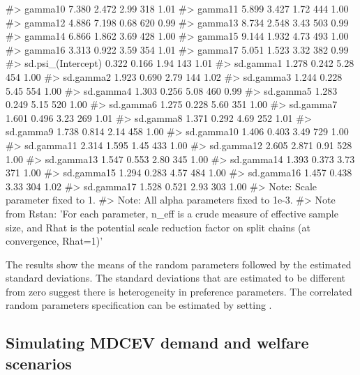 \begin{Schunk}
\begin{Soutput}
#> gamma10               7.380   2.472   2.99   318 1.01
#> gamma11               5.899   3.427   1.72   444 1.00
#> gamma12               4.886   7.198   0.68   620 0.99
#> gamma13               8.734   2.548   3.43   503 0.99
#> gamma14               6.866   1.862   3.69   428 1.00
#> gamma15               9.144   1.932   4.73   493 1.00
#> gamma16               3.313   0.922   3.59   354 1.01
#> gamma17               5.051   1.523   3.32   382 0.99
#> sd.psi_(Intercept)    0.322   0.166   1.94   143 1.01
#> sd.gamma1             1.278   0.242   5.28   454 1.00
#> sd.gamma2             1.923   0.690   2.79   144 1.02
#> sd.gamma3             1.244   0.228   5.45   554 1.00
#> sd.gamma4             1.303   0.256   5.08   460 0.99
#> sd.gamma5             1.283   0.249   5.15   520 1.00
#> sd.gamma6             1.275   0.228   5.60   351 1.00
#> sd.gamma7             1.601   0.496   3.23   269 1.01
#> sd.gamma8             1.371   0.292   4.69   252 1.01
#> sd.gamma9             1.738   0.814   2.14   458 1.00
#> sd.gamma10            1.406   0.403   3.49   729 1.00
#> sd.gamma11            2.314   1.595   1.45   433 1.00
#> sd.gamma12            2.605   2.871   0.91   528 1.00
#> sd.gamma13            1.547   0.553   2.80   345 1.00
#> sd.gamma14            1.393   0.373   3.73   371 1.00
#> sd.gamma15            1.294   0.283   4.57   484 1.00
#> sd.gamma16            1.457   0.438   3.33   304 1.02
#> sd.gamma17            1.528   0.521   2.93   303 1.00
#> Note: Scale parameter fixed to 1. 
#> Note: All alpha parameters fixed to 1e-3. 
#> Note from Rstan: 'For each parameter, n_eff is a crude measure of effective sample size, and Rhat is the potential scale reduction factor on split chains (at convergence, Rhat=1)'
\end{Soutput}
\end{Schunk}

The results show the means of the random parameters followed by the
estimated standard deviations. The standard deviations that are
estimated to be different from zero suggest there is heterogeneity in
preference parameters. The correlated random parameters specification
can be estimated by setting .

\hypertarget{simulating-mdcev-demand-and-welfare-scenarios}{%
\subsection{Simulating MDCEV demand and welfare
scenarios}\label{simulating-mdcev-demand-and-welfare-scenarios}}

